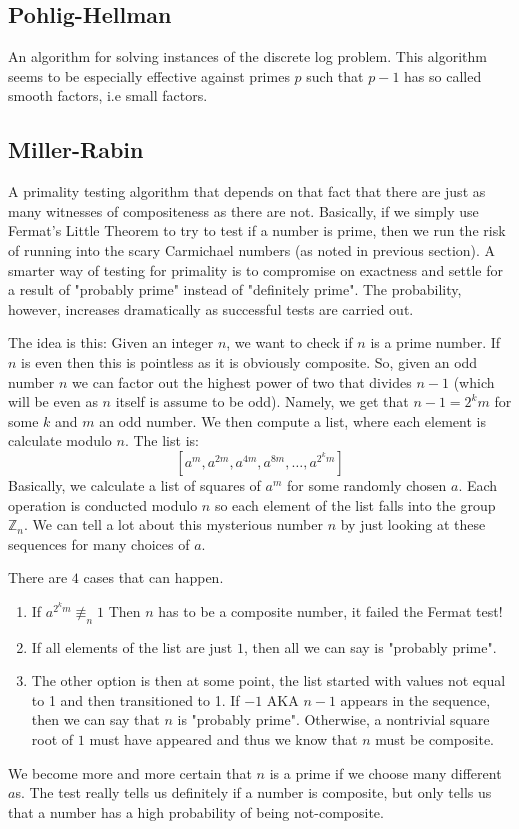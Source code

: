 \documentclass[12pt,a4paper]{article}
\begin{document}
\subsection{Pohlig-Hellman}
An algorithm for solving instances of the discrete log problem. This algorithm seems to be especially effective against primes $p$ such that $p-1$ has so called smooth factors, i.e small factors. 

\subsection{Miller-Rabin}
A primality testing algorithm that depends on that fact that there are just as many witnesses of compositeness as there are not. Basically, if we simply use Fermat's Little Theorem to try to test if a number is prime, then we run the risk of running into the scary Carmichael numbers (as noted in previous section). A smarter way of testing for primality is to compromise on exactness and settle for a result of "probably prime" instead of "definitely prime". The probability, however, increases dramatically as successful tests are carried out. 

The idea is this: Given an integer $n$, we want to check if $n$ is a prime number. If $n$ is even then this is pointless as it is obviously composite. So, given an odd number $n$ we can factor out the highest power of two that divides $n-1$ (which will be even as $n$ itself is assume to be odd). Namely, we get that $n-1 = 2^{k}m$ for some $k$ and $m$ an odd number. We then compute a list, where each element is calculate modulo $n$. The list is:
\[
	\left[a^{m}, a^{2m}, a^{4m}, a^{8m}, \ldots, a^{2^{k}m}\right]
\]
Basically, we calculate a list of squares of $a^{m}$ for some randomly chosen $a$. Each operation is conducted modulo $n$ so each element of the list falls into the group $\mathbb{Z}_{n}$. We can tell a lot about this mysterious number $n$ by just looking at these sequences for many choices of $a$. 

There are $4$ cases that can happen. 
\begin{enumerate}
	\item If $a^{2^{k}m} \not\equiv_{n} 1$ Then $n$ has to be a composite number, it failed the Fermat test!
	\item If all elements of the list are just $1$, then all we can say is "probably prime". 
	\item The other option is then at some point, the list started with values not equal to 1 and then transitioned to 1. If $-1$ AKA $n-1$ appears in the sequence, then we can say that $n$ is "probably prime". Otherwise, a nontrivial square root of $1$ must have appeared and thus we know that $n$ must be composite. 
\end{enumerate}
We become more and more certain that $n$ is a prime if we choose many different $a$s. The test really tells us definitely if a number is composite, but only tells us that a number has a high probability of being not-composite. 
\end{document}

